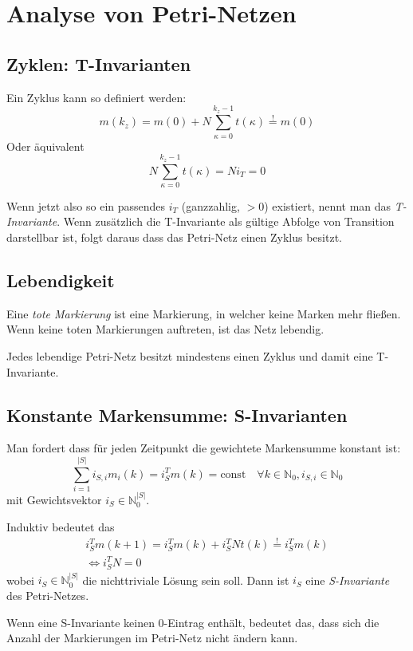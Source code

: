 \section{Analyse von Petri-Netzen}
\subsection{Zyklen: T-Invarianten}
Ein Zyklus kann so definiert werden:
\begin{equation}
    m(k_z) = m(0) + N \sum_{\kappa=0}^{k_z-1} t(\kappa) \overset{!}{=} m(0)
\end{equation}
Oder äquivalent
\begin{equation}
    N \sum_{\kappa=0}^{k_z-1} t(\kappa) = N i_T = 0
\end{equation}

Wenn jetzt also so ein passendes $i_T$ (ganzzahlig, $>0$) existiert,
nennt man das \emph{T-Invariante}.
Wenn zusätzlich die T-Invariante als gültige Abfolge von Transition darstellbar ist,
folgt daraus dass das Petri-Netz einen Zyklus besitzt.

\subsection{Lebendigkeit}
Eine \emph{tote Markierung} ist eine Markierung, in welcher keine Marken mehr fließen.
Wenn keine toten Markierungen auftreten, ist das Netz lebendig.

Jedes lebendige Petri-Netz besitzt mindestens einen Zyklus und damit eine T-Invariante.

\subsection{Konstante Markensumme: S-Invarianten}
Man fordert dass für jeden Zeitpunkt die gewichtete Markensumme konstant ist:
\begin{equation}
    \sum_{i=1}^{|S|} i_{S,i} m_i(k) = i_S^T m(k) = \text{const} \quad
    \forall k\in \mathbb{N}_0, i_{S,i}\in \mathbb{N}_0
\end{equation}
mit Gewichtsvektor $i_S \in \mathbb{N}_0^{|S|}$.

Induktiv bedeutet das
\begin{equation}
\begin{gathered}
    i_S^Tm(k+1) = i_S^Tm(k) + i_S^TNt(k) \stackrel{!}{=} i_S^Tm(k) \\
    \iff i_S^TN = 0
\end{gathered}
\end{equation}
wobei $i_S \in \mathbb{N}_0^{|S|}$ die nichttriviale Lösung sein soll.
Dann ist $i_S$ eine \emph{S-Invariante} des Petri-Netzes.

Wenn eine S-Invariante keinen 0-Eintrag enthält, bedeutet das, dass sich die
Anzahl der Markierungen im Petri-Netz nicht ändern kann.
